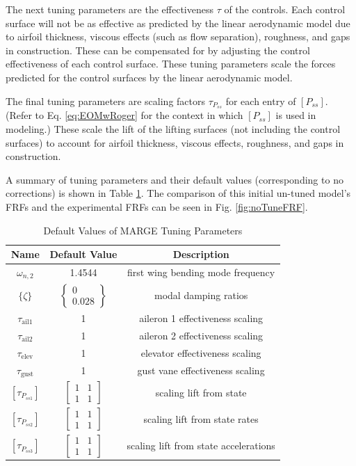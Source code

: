 The next tuning parameters are the effectiveness $\tau$ of the controls. Each control surface will not be as effective as predicted by the linear aerodynamic model due to airfoil thickness, viscous effects (such as flow separation), roughness, and gaps in construction. These can be compensated for by adjusting the control effectiveness of each control surface. These tuning parameters scale the forces predicted for the control surfaces by the linear aerodynamic model.

The final tuning parameters are scaling factors $\tau_{P_{ss}}$ for each entry of $[P_{ss}]$. (Refer to Eq. \ref{eq:EOMwRoger} for the context in which $[P_{ss}]$ is used in modeling.) These scale the lift of the lifting surfaces (not including the control surfaces) to account for airfoil thickness, viscous effects, roughness, and gaps in construction.

A summary of tuning parameters and their default values (corresponding to no corrections) is shown in Table \ref{tab:tuningParams}. The comparison of this initial un-tuned model's FRFs and the experimental FRFs can be seen in Fig. \ref{fig:noTuneFRF}.
\begin{table}[h]
	\centering
	\caption{Default Values of MARGE Tuning Parameters}
	\label{tab:tuningParams}
	\begin{tabular}{ccc}
		\hline\hline
		Name & Default Value & Description \\
		\hline
		$\omega_{n,2}$ & 1.4544 & first wing bending mode frequency \\
		$\{\zeta\}$ & $\begin{Bmatrix} 0 \\ 0.028 \end{Bmatrix}$ & modal damping ratios \\
		$\tau_\text{ail1}$ & 1 & aileron 1 effectiveness scaling \\
		$\tau_\text{ail2}$ & 1 & aileron 2 effectiveness scaling \\
		$\tau_\text{elev}$ & 1 & elevator effectiveness scaling \\
		$\tau_\text{gust}$ & 1 & gust vane effectiveness scaling \\
		$\left[\tau_{P_{ss1}}\right]$ & $\begin{bmatrix} 1 & 1 \\ 1 & 1 \end{bmatrix}$ & scaling lift from state \\
		$\left[\tau_{P_{ss2}}\right]$ & $\begin{bmatrix} 1 & 1 \\ 1 & 1 \end{bmatrix}$ & scaling lift from state rates \\
		$\left[\tau_{P_{ss3}}\right]$ & $\begin{bmatrix} 1 & 1 \\ 1 & 1 \end{bmatrix}$ & scaling lift from state accelerations \\
		\hline\hline
	\end{tabular}
\end{table}

